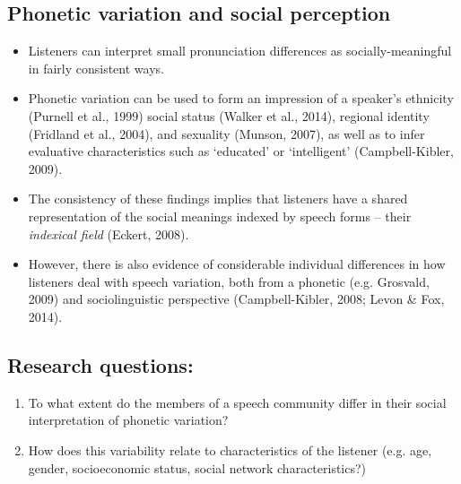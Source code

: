 \documentclass[a0,final]{a0poster}
\begin{document}
\begin{multicols}{4}							%
\raggedcolumns							%

\section*{Phonetic variation and social perception}
\begin{itemize}

\item{Listeners can interpret small pronunciation differences as socially-meaningful in fairly consistent ways.} 

\item{Phonetic variation can be used to form an impression of a speaker's ethnicity (Purnell et al., 1999) social status (Walker et al., 2014), regional identity (Fridland et al., 2004), and sexuality (Munson, 2007), as well as to infer evaluative characteristics such as `educated' or `intelligent' (Campbell-Kibler, 2009).}

\item{The consistency of these findings implies that listeners have a shared
representation of the social meanings indexed by speech forms -- their
\textit{indexical field} (Eckert, 2008).}

\item{However, there is also evidence of considerable individual differences in how listeners deal with speech variation, both from a phonetic (e.g. Grosvald, 2009) and sociolinguistic perspective (Campbell-Kibler, 2008; Levon \& Fox, 2014).}


\end{itemize}
\vspace*{-1cm}
\subsection*{Research questions:}
\begin{enumerate}
\item{To what extent do the members of a speech community differ in their social interpretation of phonetic variation?}

\item{How does this variability relate to characteristics of the listener (e.g. age, gender, socioeconomic status, social network characteristics?)}
\end{enumerate}
\vspace*{-1cm}



\end{multicols}
\end{document}
